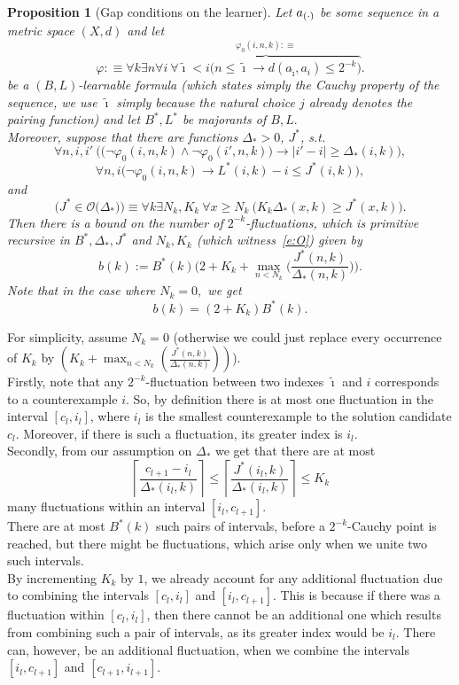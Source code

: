 \documentclass[1p]{elsarticle}
\newcommand{\be}[1][{e:\arabic{equation}}] { \begin{equation}\label{#1} }
\newcommand{\ee} { \end{equation} }
\theoremstyle{plain}
\newtheorem{prop}[thm]{Proposition}
\theoremstyle{definition}
\theoremstyle{remark}
\renewenvironment{proof}[1][]{\noindent{\bf Proof{#1}. }}{\nopagebreak[4]{\hspace*{\fill}
  $\Box$              %
 }{\vspace{2ex}}}
\renewcommand{\phi}{\varphi}
\theoremstyle{definition}
\begin{document}
{\begin{prop}[{Gap conditions on the learner}]\label{p:gap}
Let $a_{(\cdot)}$ be some sequence in a metric space $(X,d)$ and let 
\[
\phi:\equiv \forall k\exists n\forall i\ \overbrace{\forall \tilde{\imath}<i \big( n\leq \tilde{\imath}\rightarrow d(a_{\tilde{\imath}},a_{i})\leq 2^{-k}\big)}^{\phi_0(i,n,k):\equiv}.
\] 
be a $(B,L)$-learnable formula (which states simply the Cauchy property 
of the sequence, we use $\tilde{\imath}$ simply because the natural choice $j$ already denotes the pairing function) and let $B^*,L^*$ be
majorants of $B,L.$ \\
Moreover, suppose that there are functions $\Delta_*>0$, $J^*$, s.t.
\[\forall n,i,i'\ \Big( \big( \neg\phi_0(i,n,k)\wedge\neg\phi_0(i',n,k))\rightarrow
|i'-i|\geq\Delta_*(i,k)\Big),\]
\[\forall n,i \big( \neg\phi_0(i,n,k) \rightarrow L^*(i,k)-i\leq J^*(i,k)\big),\]
and
\be[e:O]
\big( J^*\in\mathcal{O}\big(\Delta_*\big)\big)\equiv \forall k\exists N_k,K_k\ 
\forall x\geq N_k\ \big( 
K_k\Delta_*(x,k)\geq J^*(x,k)\big).
\ee
Then there is a bound on the number of $2^{-k}$-fluctuations,
which is primitive recursive 
in $B^*,\Delta_*,J^*$ and $N_k,K_k$ (which witness~\eqref{e:O}) given by
\[b(k):=B^*(k)\bigg(2+K_k+\max_{n<N_k}\Big(\frac{J^*(n,k)}{\Delta_*(n,k)}\Big)\bigg).\]
Note that in the case where $N_k=0,$ we get
\[b(k)=(2+K_k)B^*(k).\]
\end{prop}
\begin{proof}
For simplicity, assume $N_k=0$ (otherwise we could just replace every occurrence 
of $K_k$ by $(K_k+\max_{n<N_k}(\frac{J^*(n,k)}{\Delta_*(n,k)}))$).\\
Firstly, note that any $2^{-k}$-fluctuation between two indexes $\tilde{\imath}$ and $i$ corresponds to a counterexample $i$. So, by definition there 
is at most one fluctuation in the interval $[c_l,i_l]$, where 
$i_l$ is the smallest counterexample to the solution 
candidate $c_l$. Moreover, if there is such a fluctuation, its greater index is $i_l$.\\
Secondly, from our assumption on $\Delta_*$ we get that there are at most
\[
\left\lceil \frac{c_{l+1}-i_l}{\Delta_*(i_l,k)} \right\rceil \leq \left\lceil \frac{J^*(i_l,k)}{\Delta_*(i_l,k)} \right\rceil \leq K_k
\]
many fluctuations within an interval $[i_l,c_{l+1}]$.\\
There are at most $B^*(k)$ such pairs of intervals, before a $2^{-k}$-Cauchy point is reached, but there might be fluctuations, which arise only when we
unite two such intervals.\\
By incrementing $K_k$ by $1$, we already account for any additional fluctuation due to
combining the intervals $[c_l,i_l]$ and $[i_l,c_{l+1}]$. This is because if there was a fluctuation within $[c_l,i_l]$, then there cannot be an additional one which results from combining such a pair of intervals, as its greater index would be $i_l$. There can, however, be an additional fluctuation, when we combine the intervals $[i_l,c_{l+1}]$ and $[c_{l+1},i_{l+1}]$.\\
\end{proof}

}
\end{document}
